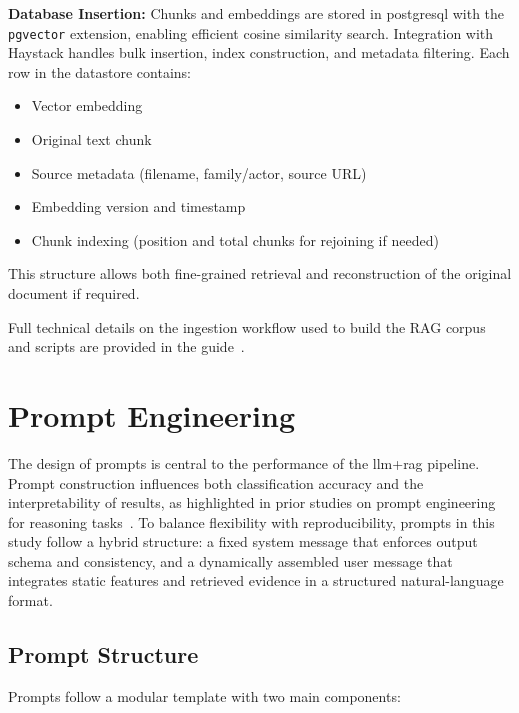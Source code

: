 \vspace{0.5em}
\noindent\textbf{Database Insertion:} Chunks and embeddings are stored in
\gls{postgresql} with the \texttt{pgvector} extension, enabling efficient cosine
similarity search. Integration with Haystack handles bulk insertion, index
construction, and metadata filtering. Each row in the datastore contains:
\begin{itemize}
      \item Vector embedding
      \item Original text chunk
      \item Source metadata (filename, family/actor, source URL)
      \item Embedding version and timestamp
      \item Chunk indexing (position and total chunks for rejoining if needed)
\end{itemize}
This structure allows both fine-grained retrieval and reconstruction of the original document if required.

\vspace{0.5em}
\noindent Full technical details on the ingestion workflow used to build the RAG corpus and
scripts are provided in the guide~\cite{rexisIngestionPipeline}.

\section{Prompt Engineering}\label{sec:PromptEngineering}
The design of prompts is central to the performance of the \gls{llm}+\gls{rag} pipeline. Prompt
construction influences both classification accuracy and the interpretability of results, as
highlighted in prior studies on prompt engineering for reasoning tasks~\cite{sahoo2024systematic,
      fujii2024llm}. To balance flexibility with reproducibility, prompts in this study follow a hybrid
structure: a fixed system message that enforces output schema and consistency, and a dynamically
assembled user message that integrates static features and retrieved evidence in a structured
natural-language format.

\subsection{Prompt Structure}\label{subsec:PromptStructure}
Prompts follow a modular template with two main components:


